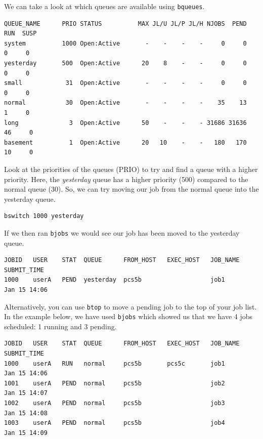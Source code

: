 \documentclass[11pt]{article}
\begin{document}
    We can take a look at which queues are available using \texttt{bqueues}.

    \begin{verbatim}
QUEUE_NAME      PRIO STATUS          MAX JL/U JL/P JL/H NJOBS  PEND   RUN  SUSP
system          1000 Open:Active       -    -    -    -     0     0     0     0
yesterday       500  Open:Active      20    8    -    -     0     0     0     0
small            31  Open:Active       -    -    -    -     0     0     0     0
normal           30  Open:Active       -    -    -    -    35    13     1     0
long              3  Open:Active      50    -    -    - 31686 31636    46     0
basement          1  Open:Active      20   10    -    -   180   170    10     0
\end{verbatim}

    Look at the priorities of the queues (PRIO) to try and find a queue with
a higher priority. Here, the \textit{yesterday} queue has a higher
priority (500) compared to the normal queue (30). So, we can try moving
our job from the normal queue into the yesterday queue.

    \begin{verbatim}
bswitch 1000 yesterday
\end{verbatim}

    If we then ran \texttt{bjobs} we would see our job has been moved to the
yesterday queue.

    \begin{verbatim}
JOBID   USER    STAT  QUEUE      FROM_HOST   EXEC_HOST   JOB_NAME   SUBMIT_TIME
1000    userA   PEND  yesterday  pcs5b                   job1       Jan 15 14:06
\end{verbatim}

    Alternatively, you can use \texttt{btop} to move a pending job to the
top of your job list. In the example below, we have used \texttt{bjobs}
which showed us that we have 4 jobs scheduled: 1 running and 3 pending.

    \begin{verbatim}
JOBID   USER    STAT  QUEUE      FROM_HOST   EXEC_HOST   JOB_NAME   SUBMIT_TIME
1000    userA   RUN   normal     pcs5b       pcs5c       job1       Jan 15 14:06
1001    userA   PEND  normal     pcs5b                   job2       Jan 15 14:07
1002    userA   PEND  normal     pcs5b                   job3       Jan 15 14:08
1003    userA   PEND  normal     pcs5b                   job4       Jan 15 14:09
\end{verbatim}
\end{document}
